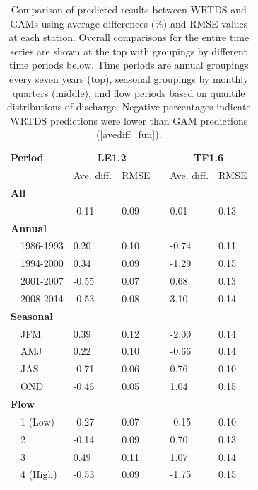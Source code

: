 \documentclass{svjour3}\usepackage[]{graphicx}\usepackage[]{color}
\begin{document}
\begin{table}[!tbp]
\caption{Comparison of predicted results between \ac{WRTDS} and \acp{GAM} using average differences (\%) and \ac{RMSE} values at each station.  Overall comparisons for the entire time series are shown at the top with groupings by different time periods below.  Time periods are annual groupings every seven years (top), seasonal groupings by monthly quarters (middle), and flow periods based on quantile distributions of discharge. Negative percentages indicate \ac{WRTDS} predictions were lower than \ac{GAM} predictions (\cref{avediff_fun}).\label{tab:perfbtw}} 
\begin{center}
\begin{tabular}{lllcll}
\hline\hline
\multicolumn{1}{l}{\bfseries Period}&\multicolumn{2}{c}{\bfseries LE1.2}&\multicolumn{1}{c}{\bfseries }&\multicolumn{2}{c}{\bfseries TF1.6}\tabularnewline
\cline{2-3} \cline{5-6}
\multicolumn{1}{l}{}&\multicolumn{1}{c}{Ave. diff.}&\multicolumn{1}{c}{\ac{RMSE}}&\multicolumn{1}{c}{}&\multicolumn{1}{c}{Ave. diff.}&\multicolumn{1}{c}{\ac{RMSE}}\tabularnewline
\hline
{\bfseries All}&&&&&\tabularnewline
~~&-0.11&0.09&& 0.01&0.13\tabularnewline
\hline
{\bfseries Annual}&&&&&\tabularnewline
~~1986-1993& 0.20&0.10&&-0.74&0.11\tabularnewline
~~1994-2000& 0.34&0.09&&-1.29&0.15\tabularnewline
~~2001-2007&-0.55&0.07&& 0.68&0.13\tabularnewline
~~2008-2014&-0.53&0.08&& 3.10&0.14\tabularnewline
\hline
{\bfseries Seasonal}&&&&&\tabularnewline
~~JFM& 0.39&0.12&&-2.00&0.14\tabularnewline
~~AMJ& 0.22&0.10&&-0.66&0.14\tabularnewline
~~JAS&-0.71&0.06&& 0.76&0.10\tabularnewline
~~OND&-0.46&0.05&& 1.04&0.15\tabularnewline
\hline
{\bfseries Flow}&&&&&\tabularnewline
~~1 (Low)&-0.27&0.07&&-0.15&0.10\tabularnewline
~~2&-0.14&0.09&& 0.70&0.13\tabularnewline
~~3& 0.49&0.11&& 1.07&0.14\tabularnewline
~~4 (High)&-0.53&0.09&&-1.75&0.15\tabularnewline
\hline
\end{tabular}\end{center}

\end{table}
\end{document}
